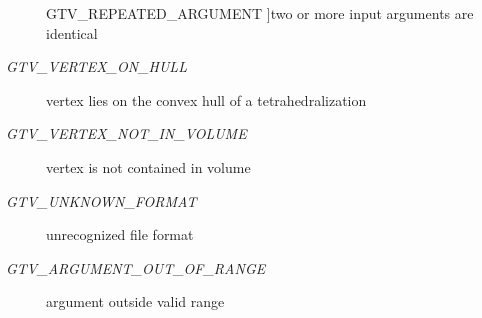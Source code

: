 \begin{Desc}
\begin{description}
{GTV\_\-REPEATED\_\-ARGUMENT\label{group__status_ggfb23c4ddc35e1ea652487a43f9a0f8a97b9a5a62482ecd7dbcd11dc55e529ac5}
}]two or more input arguments are identical \item[{\em 
GTV\_\-VERTEX\_\-ON\_\-HULL\label{group__status_ggfb23c4ddc35e1ea652487a43f9a0f8a9da984c5f7fbaec5f872fccff8d2e79c9}
}]vertex lies on the convex hull of a tetrahedralization \item[{\em 
GTV\_\-VERTEX\_\-NOT\_\-IN\_\-VOLUME\label{group__status_ggfb23c4ddc35e1ea652487a43f9a0f8a9792fd97f17705dea5f25f5b0a464c178}
}]vertex is not contained in volume \item[{\em 
GTV\_\-UNKNOWN\_\-FORMAT\label{group__status_ggfb23c4ddc35e1ea652487a43f9a0f8a91700209863555fdde7857fb373aabebe}
}]unrecognized file format \item[{\em 
GTV\_\-ARGUMENT\_\-OUT\_\-OF\_\-RANGE\label{group__status_ggfb23c4ddc35e1ea652487a43f9a0f8a9c82cb106747883a1a29a2971bbc78899}
}]argument outside valid range \end{description}
\end{Desc}

